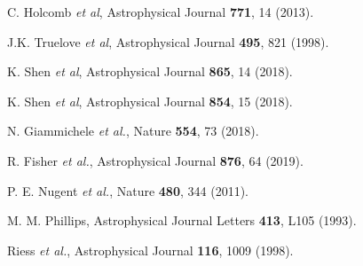 \begin{thebibliography}{11}

{} C. Holcomb {\it et al}, Astrophysical Journal {\bf 771}, 14 (2013).


 J.K. Truelove {\it et al}, Astrophysical Journal {\bf 495}, 821 (1998).


 K. Shen {\it et al}, Astrophysical Journal {\bf 865}, 14 (2018).

 K. Shen {\it et al}, Astrophysical Journal {\bf 854}, 15 (2018).

 N. Giammichele {\it et al.}, Nature {\bf 554}, 73 (2018).

 R. Fisher {\it et al.}, Astrophysical Journal {\bf 876}, 64 (2019).
	

 P. E. Nugent {\it et al.}, Nature {\bf480},  344 (2011).

 M. M. Phillips, Astrophysical Journal Letters {\bf 413}, L105 (1993).

 Riess {\it et al.}, Astrophysical Journal {\bf 116}, 1009 (1998).










\end{thebibliography}
